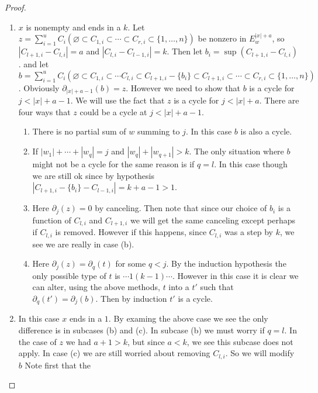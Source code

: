 \documentclass{article}
\begin{document}
\begin{proof}
\begin{enumerate}
 	\item $x$ is nonempty and ends in a $k$. Let $z = \sum_{i=1}^u C_i (\varnothing \subset 
        C_{1,i} \subset 
        \cdots \subset C_{r,i} \subset \{1, \ldots, n\})$ be nonzero in $E^{|x|+a}_w$, so 
        $|C_{l+1, i} - C_{l, i}| = a$ and $|C_{l, i} - C_{l-1, i}| = k$.  Then let 
        $b_i = \sup(C_{l+1,i}-C_{l, i})$.
        and let $b = \sum_{i=1}^u C_i (\varnothing \subset C_{1,i} \subset \cdots C_{l,i} 
        \subset C_{l+1,i} - \{b_i\} \subset C_{l+1, i} \subset \cdots \subset C_{r,i} \subset 
        \{1, \ldots, n\})$. Obviously $\partial_{|x|+a-1}(b) = z$. However we need to show that 
        $b$
        is a cycle for $j < |x|+a-1$. We will use the fact that $z$ is a cycle for $j < 
        |x|+a$. 
   	  There are four ways that $z$ could be a cycle at $j < |x|+a-1$.
	  \begin{enumerate}
          \item There is no partial sum of $w$ summing to $j$. In this case $b$ is also a cycle.
          \item If $|w_1| + \cdots + |w_q| = j$ and $|w_q|+|w_{q+1}| > k$. The only situation 
            where $b$ might not be a cycle for the same reason is if $q = l$. In this case though
            we are still ok since by hypothesis $|C_{l+1, i} - \{b_i\} - C_{l-1, i}| = k+a-1 > 1$.
          \item Here $\partial_j(z) = 0$ by canceling. Then note that since our choice of $b_i$ is
            a function of $C_{l,i}$ and $C_{l+1, i}$ we will get the same canceling except perhaps
            if $C_{l, i}$ is removed. However if this happens, since $C_{l, i}$ was a step by $k$,
            we see we are really in case (b).
          \item Here $\partial_j(z) = \partial_q(t)$ for some $q < j$. By the induction hypothesis the only possible type
            of $t$ is $\cdots 1 (k-1) \cdots$. However in this case it is clear we can alter, using the above methods, 
            $t$ into a $t'$ such that $\partial_{q}(t') = \partial_j (b)$. Then by induction $t'$ is a cycle.
        \end{enumerate}
      \item In this case $x$ ends in a $1$. By examing the above case we see the only difference 
        is in subcases (b) and (c). In subcase (b) we must worry if $q = l$. In the case of $z$ 
        we had $a + 1 > k$, but since $a < k$, we see this subcase does not apply. In case (c) we
        are still worried about removing $C_{l, i}$. So we will modify $b$ Note first that the 

\end{enumerate}
\end{proof}
\end{document}
